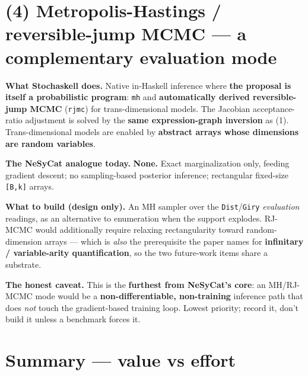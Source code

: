 \documentclass[11pt]{article}
\newcommand{\code}[1]{\texttt{#1}}
\begin{document}
\section*{(4) Metropolis-Hastings / reversible-jump MCMC --- a complementary evaluation mode}

\textbf{What Stochaskell does.} Native in-Haskell inference where \textbf{the proposal is itself a
probabilistic program}: \code{mh} and \textbf{automatically derived reversible-jump MCMC} (\code{rjmc})
for trans-dimensional models. The Jacobian acceptance-ratio adjustment is solved by the \textbf{same
expression-graph inversion} as (1). Trans-dimensional models are enabled by \textbf{abstract arrays whose
dimensions are random variables}.

\textbf{The NeSyCat analogue today.} \textbf{None.} Exact marginalization only, feeding gradient descent;
no sampling-based posterior inference; rectangular fixed-size \code{[B,k]} arrays.

\textbf{What to build (design only).} An MH sampler over the \code{Dist}/\code{Giry} \emph{evaluation}
readings, as an alternative to enumeration when the support explodes. RJ-MCMC would additionally require
relaxing rectangularity toward random-dimension arrays --- which is \emph{also} the prerequisite the
paper names for \textbf{infinitary / variable-arity quantification}, so the two future-work items share a
substrate.

\textbf{The honest caveat.} This is the \textbf{furthest from NeSyCat's core}: an MH/RJ-MCMC mode would
be a \textbf{non-differentiable, non-training} inference path that does \emph{not} touch the gradient-based
training loop. Lowest priority; record it, don't build it unless a benchmark forces it.

\section*{Summary --- value vs effort}
\end{document}
